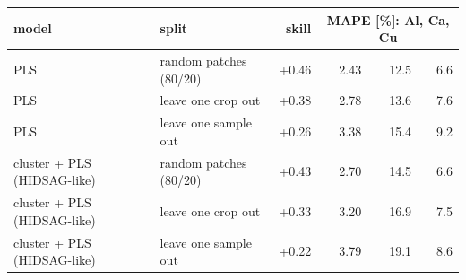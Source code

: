 \begin{tabular}{llrrrr}
\toprule
model & split & skill & \multicolumn{3}{c}{MAPE [\%]: Al, Ca, Cu} \\
\midrule
PLS & random patches (80/20) & +0.46 & 2.43 & 12.5 & 6.6 \\
PLS & leave one crop out & +0.38 & 2.78 & 13.6 & 7.6 \\
PLS & leave one sample out & +0.26 & 3.38 & 15.4 & 9.2 \\
cluster + PLS (HIDSAG-like) & random patches (80/20) & +0.43 & 2.70 & 14.5 & 6.6 \\
cluster + PLS (HIDSAG-like) & leave one crop out & +0.33 & 3.20 & 16.9 & 7.5 \\
cluster + PLS (HIDSAG-like) & leave one sample out & +0.22 & 3.79 & 19.1 & 8.6 \\
\bottomrule
\end{tabular}
